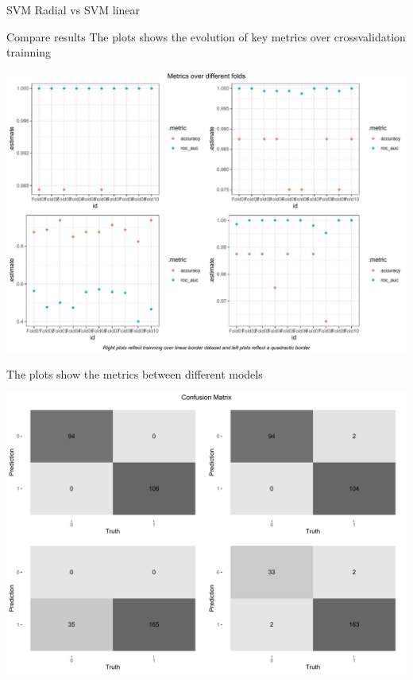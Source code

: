 \documentclass[
  ignorenonframetext,
]{article}
\begin{document}
\begin{frame}[fragile]{SVM Radial vs SVM linear}
\begin{block}{Compare results}
The plots shows the evolution of key metrics over crossvalidation trainning

\begin{center}\includegraphics{_main_files/figure-beamer/unnamed-chunk-83-1} \end{center}

The plots show the metrics between different models

\begin{center}\includegraphics{_main_files/figure-beamer/unnamed-chunk-84-1} \end{center}


\end{block}
\end{frame}
\end{document}
